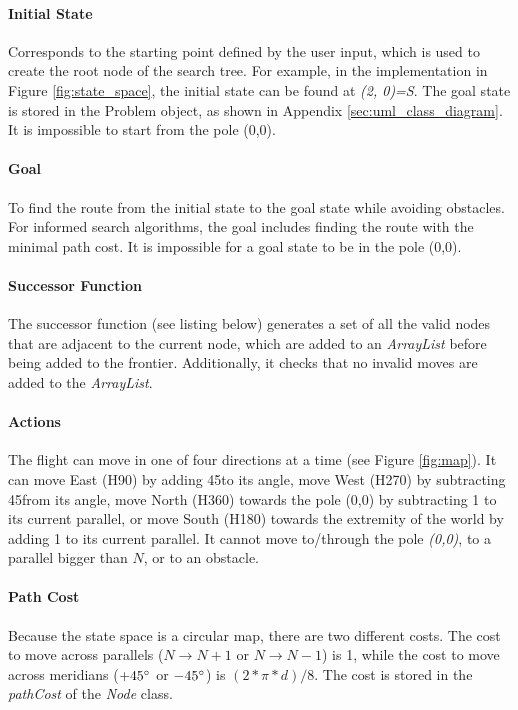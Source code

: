 \documentclass[letterpaper,12pt]{article}
\begin{document}
\paragraph{Initial State} Corresponds to the starting point defined by the user input, which is used to create the root node of the search tree. For example, in the implementation in Figure \ref{fig:state_space}, the initial state can be found at \textit{(2, 0)=S}. The goal state is stored in the Problem object, as shown in Appendix \ref{sec:uml_class_diagram}. It is impossible to start from the pole (0,0).

\paragraph{Goal} To find the route from the initial state to the goal state while avoiding obstacles. For informed search algorithms, the goal includes finding the route with the minimal path cost. It is impossible for a goal state to be in the pole (0,0). %

\paragraph{Successor Function} The successor function (see listing below) generates a set of all the valid nodes that are adjacent to the current node, which are added to an \textit{ArrayList} before being added to the frontier. Additionally, it checks that no invalid moves are added to the \textit{ArrayList}.



\paragraph{Actions} The flight can move in one of four directions at a time (see Figure \ref{fig:map}). It can move East (H90) by adding 45\degree to its angle, move West (H270) by subtracting 45\degree from its angle, move North (H360) towards the pole (0,0) by subtracting 1 to its current parallel, or move South (H180) towards the extremity of the world by adding 1 to its current parallel. It cannot move to/through the pole \textit{(0,0)}, to a parallel bigger than $N$, or to an obstacle.

\paragraph{Path Cost} Because the state space is a circular map, there are two different costs. The cost to move across parallels ($N \rightarrow N+1$ or $N \rightarrow N-1$) is 1, while the cost to move across meridians ($+45\degree$ or $-45\degree$) is $(2*\pi*d) / 8$. The cost is stored in the \textit{pathCost} of the \textit{Node} class.
\end{document}
